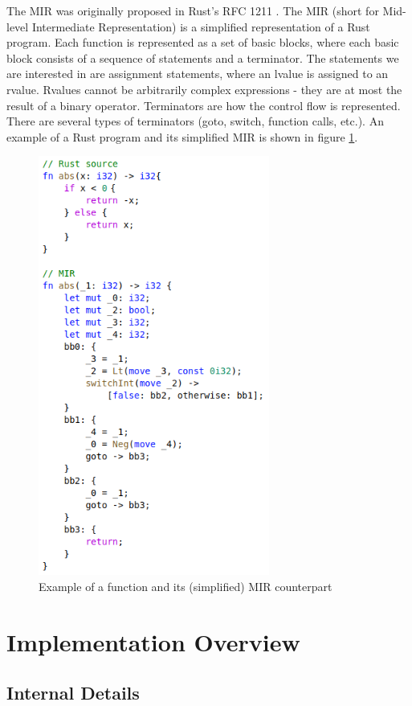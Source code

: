 \documentclass[11pt,a4paper]{article}
\begin{document}
The MIR was originally proposed in Rust's RFC 1211 \cite{MIR}. The
MIR (short for Mid-level Intermediate Representation) is a simplified representation
of a Rust program. Each function is represented as a set of basic blocks, where
each basic block consists of a sequence of statements and a terminator. The statements
we are interested in are assignment statements, where an lvalue is assigned to an rvalue.
Rvalues cannot be arbitrarily complex expressions - they are at most the result of a
binary operator. Terminators are how the control flow is represented. There are
several types of terminators (goto, switch, function calls, etc.). An example of a Rust program
and its simplified MIR is shown in figure \ref{mir}.


\begin{figure}[h]
    \includegraphics[width=7.6cm]{img/mir.png}
    \caption{Example of a function and its (simplified) MIR counterpart}
    \label{mir}
\end{figure}


\section{Implementation Overview}

\subsection{Internal Details}
\end{document}
